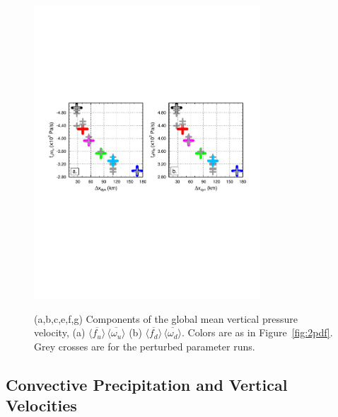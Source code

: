 \documentclass[times]{qjrms4}
\begin{document}
\begin{figure}[t]
\begin{center}
\noindent\includegraphics[width=20pc,angle=0]{figs/temp_diags_2panel.pdf}\\
\end{center}
\caption{(a,b,c,e,f,g) Components of the global mean vertical pressure velocity, (a) $\overline{\langle f_{u} \rangle} \, \overline{\langle \omega_{u} \rangle}$ (b) $\overline{\langle f_{d} \rangle} \, \overline{\langle \omega_{d} \rangle}$. Colors are as in Figure~\ref{fig:2pdf}. Grey crosses are for the perturbed parameter runs.}
\label{fig:2panel}
\end{figure}

\subsection{Convective Precipitation and Vertical Velocities}
\end{document}
